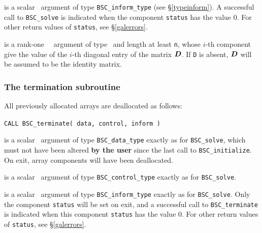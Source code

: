 \documentclass{galahad}
\newcommand{\packagename}{BSC}
\begin{document}
\begin{description}
 is a scalar \intentout\ argument of type 
{\tt \packagename\_inform\_type}
(see \S\ref{typeinform}). A successful call to
{\tt \packagename\_solve}
is indicated when the  component {\tt status} has the value 0. 
For other return values of {\tt status}, see \S\ref{galerrors}.

 is a rank-one \optional\ \intentin\ argument of type \realdp\
and length at least {\tt n}, whose $i$-th component give the value of the 
$i$-th diagonal entry of the matrix ${\bm{D}}$. If {\tt D} is absent, ${\bm{D}}$
will be assumed to be the identity matrix.

\end{description}


\subsubsection{The  termination subroutine}
All previously allocated arrays are deallocated as follows:
\vspace*{1mm}

\hspace{8mm}
{\tt CALL \packagename\_terminate( data, control, inform )}

\begin{description}

 is a scalar \intentinout\ argument of type 
{\tt \packagename\_data\_type} 
exactly as for
{\tt \packagename\_solve},
which must not have been altered {\bf by the user} since the last call to 
{\tt \packagename\_initialize}.
On exit, array components will have been deallocated.

 is a scalar \intentin\ argument of type 
{\tt \packagename\_control\_type}
exactly as for
{\tt \packagename\_solve}.

 is a scalar \intentout\ argument of type
{\tt \packagename\_inform\_type}
exactly as for
{\tt \packagename\_solve}.
Only the component {\tt status} will be set on exit, and a 
successful call to 
{\tt \packagename\_terminate}
is indicated when this  component {\tt status} has the value 0. 
For other return values of {\tt status}, see \S\ref{galerrors}.

\end{description}

\end{document}
